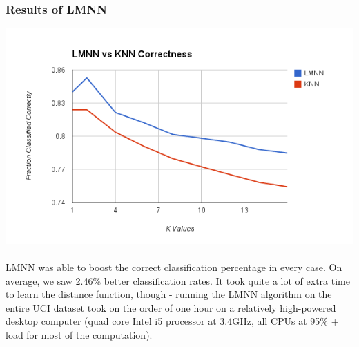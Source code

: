\documentclass[11pt]{article}
\begin{document}
\subsubsection*{Results of LMNN}
\includegraphics[scale=.66]{knnvslmnn.png}
\paragraph{}
LMNN was able to boost the correct classification percentage in every case. On average, we saw 2.46\% better classification rates. It took quite a lot of extra time to learn the distance function, though - running the LMNN algorithm on the entire UCI dataset took on the order of one hour on a relatively high-powered desktop computer (quad core Intel i5 processor at 3.4GHz, all CPUs at 95\% + load for most of the computation).
\end{document}

